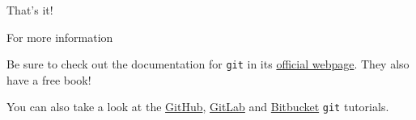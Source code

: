 \documentclass[dvipsnames, usenames]{beamer}
\begin{document}
\begin{frame}[plain]
	\begin{center}
		{\Huge
		That's it!}

		\bigskip

		{\huge
		For more information
		}

		\bigskip

		Be sure to check out the documentation for \texttt{git} in its \href{https://git-scm.com/}{official webpage}.
		They also have a free book!

		You can also take a look at the \href{https://github.com/}{GitHub}, \href{https://gitlab.com/}{GitLab} and \href{https://bitbucket.org/}{Bitbucket} \texttt{git} tutorials.
	\end{center}
\end{frame}
\end{document}
